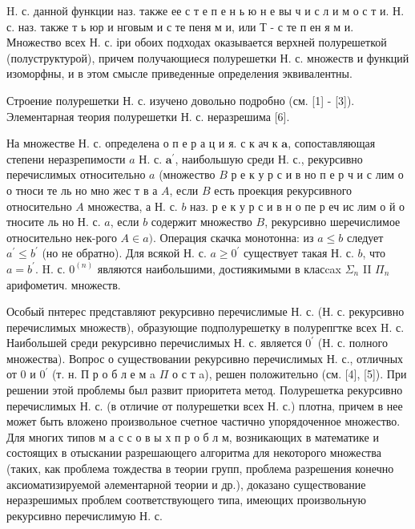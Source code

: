 \documentclass[10pt]{article}
\begin{document}
H. с. данной функции наз. также ее с т е п е н ь ю н е вы ч и с л и м о с т и. Н. с. наз. также т ь юр и нговым и с те пеня м и, или Т - с те п ен я м и. Множество всех Н. с. іри обоих подходах оказывается верхней полурешеткой (полуструктурой), причем получающиеся полурешетки Н. с. множеств и функций изоморфны, и в этом смысле приведенные определения эквивалентны.



Строение полурешетки Н. с. изучено довольно подробно (см. [1] - [3]). Элементарная теория полурешетки Н. с. неразрешима [6].



На множестве Н. с. определена о п е р а ц и я. с к ач к $\mathbf{a}$, сопоставляющая степени неразрепимости $a$ Н. с. $\boldsymbol{a}^{\prime}$, наибольшую среди Н. с., рекурсивно перечислимых относительно $a$ (множество $B$ р е к у р с и в но п е р ч и с лим о о тноси те ль но мно жес т в а $A$, если $B$ есть проекция рекурсивного относительно $A$ множества, а Н. с. $b$ наз. р е к у р с и в н о пе р еч ис лим о й о тносите ль но Н. с. $a$, если $b$ содержит множество $B$, рекурсивно шеречислимое относительно нек-рого $A \in a)$. Операция скачка монотонна: из $a \leqslant b$ следует $a^{\prime} \leqslant b^{\prime}$ (но не обратно). Для всякой Н. с. $a \geqslant 0^{\prime}$ существует такая Н. с. $b$, что $a=b^{\prime}$. H. с. $0^{(n)}$ являются наибольшими, достиякимыми в класcax $\Sigma_{n}$ II $\Pi_{n}$ арифометич. множеств.



Особый пнтерес представляют рекурсивно перечислимые Н. с. (Н. с. рекурсивно перечислимых множеств), образующие подполурешетку в полурепгтке всех H. с. Наибольшей среди рекурсивно перечислимых Н. с. является $0^{\prime}$ (Н. с. полного множества). Вопрос о существовании рекурсивно перечислимых Н. с., отличных от 0 и $0^{\prime}$ (т. н. П р о б л е м a $\Pi$ о с т a), решен положительно (см. [4], [5]). При решении этой проблемы был развит приоритета метод. Полурешетка рекурсивно перечислимых Н. с. (в отличие от полурешетки всех Н. с.) плотна, причем в нее может быть вложено произвольное счетное частично упорядоченное множество. Для многих типов м а с с о в ы х п р о б л м, возникающих в математике и состоящих в отыскании разрешающего алгоритма для некоторого множества (таких, как проблема тождества в теории групп, проблема разрешения конечно аксиоматизируемой әлементарной теории и др.), доказано существование неразрешимых проблем соответствующего типа, имеющих произвольную рекурсивно перечислимую Н. с.
\end{document}
